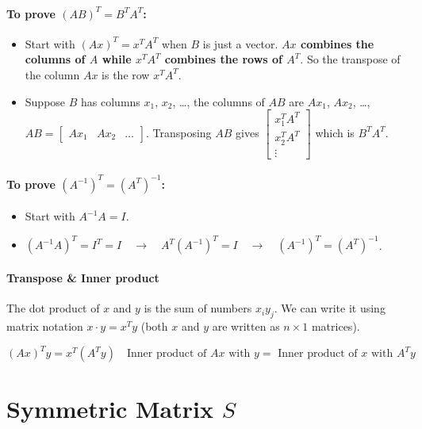 \paragraph{To prove $(AB)^T = B^T A^T$:}
\begin{itemize}
    \item Start with $(Ax)^T = x^T A^T$ when $B$ is just a vector.
          \textbf{$Ax$ combines the columns of $A$ while $x^TA^T$ combines the rows of $A^T$}.
          So the transpose of the column $Ax$ is the row $x^TA^T$.

    \item Suppose $B$ has columns $x_1$, $x_2$, \dots, the columns of $AB$ are $Ax_1$, $Ax_2$, \dots,
          $AB = \begin{bmatrix}
                  Ax_1 & Ax_2 & \dots
              \end{bmatrix}$. Transposing $AB$ gives $\begin{bmatrix}
                  x_1^TA^T \\ x_2^TA^T \\ \vdots
              \end{bmatrix}$
          which is $B^TA^T$.
\end{itemize}

\paragraph{To prove $(A^{-1})^{T} = (A^{T})^{-1}$:}
\begin{itemize}
    \item Start with $A^{-1}A = I$.
    \item $(A^{-1}A)^T = I^T = I \quad \rightarrow \quad A^T(A^{-1})^T = I \quad \rightarrow \quad (A^{-1})^T = (A^T)^{-1}$.
\end{itemize}

\paragraph{Transpose \& Inner product}

The dot product of $x$ and $y$ is the sum of numbers $x_iy_j$. We can write it using matrix notation $x \cdot y = x^Ty$ (both $x$ and $y$ are written as $n \times 1$ matrices).

\[
    (Ax)^Ty = x^T(A^Ty) \quad \text{Inner product of $Ax$ with $y = $ Inner product of $x$ with $A^Ty$}
\]

\section{Symmetric Matrix $S$}

